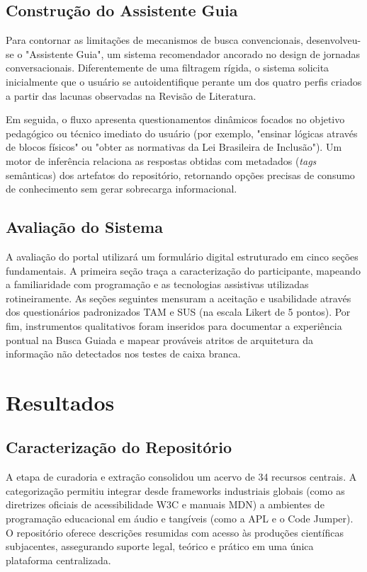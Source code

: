 \documentclass[12pt, a4paper, oneside]{article}
\begin{document}
\subsection{Construção do Assistente Guia}
Para contornar as limitações de mecanismos de busca convencionais, desenvolveu-se o "Assistente Guia", um sistema recomendador ancorado no design de jornadas conversacionais. Diferentemente de uma filtragem rígida, o sistema solicita inicialmente que o usuário se autoidentifique perante um dos quatro perfis criados a partir das lacunas observadas na Revisão de Literatura. 

Em seguida, o fluxo apresenta questionamentos dinâmicos focados no objetivo pedagógico ou técnico imediato do usuário (por exemplo, "ensinar lógicas através de blocos físicos" ou "obter as normativas da Lei Brasileira de Inclusão"). Um motor de inferência relaciona as respostas obtidas com metadados (\textit{tags} semânticas) dos artefatos do repositório, retornando opções precisas de consumo de conhecimento sem gerar sobrecarga informacional.

\subsection{Avaliação do Sistema}
A avaliação do portal utilizará um formulário digital estruturado em cinco seções fundamentais. A primeira seção traça a caracterização do participante, mapeando a familiaridade com programação e as tecnologias assistivas utilizadas rotineiramente. As seções seguintes mensuram a aceitação e usabilidade através dos questionários padronizados TAM e SUS (na escala Likert de 5 pontos). Por fim, instrumentos qualitativos foram inseridos para documentar a experiência pontual na Busca Guiada e mapear prováveis atritos de arquitetura da informação não detectados nos testes de caixa branca.

\section{Resultados}

\subsection{Caracterização do Repositório}
A etapa de curadoria e extração consolidou um acervo de 34 recursos centrais. A categorização permitiu integrar desde frameworks industriais globais (como as diretrizes oficiais de acessibilidade W3C e manuais MDN) a ambientes de programação educacional em áudio e tangíveis (como a APL e o Code Jumper). O repositório oferece descrições resumidas com acesso às produções científicas subjacentes, assegurando suporte legal, teórico e prático em uma única plataforma centralizada.
\end{document}
